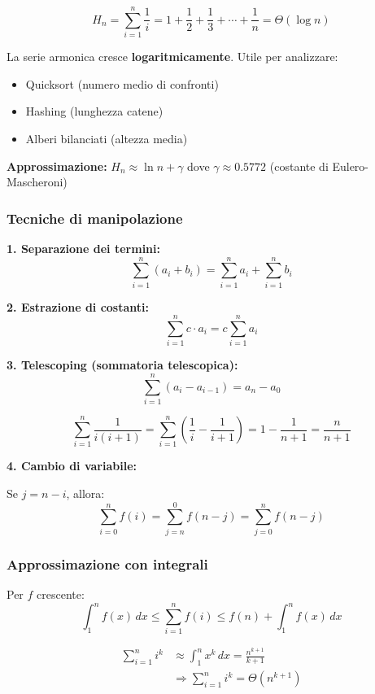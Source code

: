 \[
H_n = \sum_{i=1}^{n} \frac{1}{i} = 1 + \frac{1}{2} + \frac{1}{3} + \cdots + \frac{1}{n} = \Theta(\log n)
\]

\begin{nota}
	La serie armonica cresce \textbf{logaritmicamente}. Utile per analizzare:
	\begin{itemize}
		\item Quicksort (numero medio di confronti)
		\item Hashing (lunghezza catene)
		\item Alberi bilanciati (altezza media)
	\end{itemize}
	
	\textbf{Approssimazione:} $H_n \approx \ln n + \gamma$ dove $\gamma \approx 0.5772$ (costante di Eulero-Mascheroni)
\end{nota}

\subsubsection{Tecniche di manipolazione}

\textbf{1. Separazione dei termini:}
\[
\sum_{i=1}^{n} (a_i + b_i) = \sum_{i=1}^{n} a_i + \sum_{i=1}^{n} b_i
\]

\textbf{2. Estrazione di costanti:}
\[
\sum_{i=1}^{n} c \cdot a_i = c \sum_{i=1}^{n} a_i
\]

\textbf{3. Telescoping (sommatoria telescopica):}
\[
\sum_{i=1}^{n} (a_i - a_{i-1}) = a_n - a_0
\]

\begin{esempio}
	\[
	\sum_{i=1}^{n} \frac{1}{i(i+1)} = \sum_{i=1}^{n} \left(\frac{1}{i} - \frac{1}{i+1}\right) = 1 - \frac{1}{n+1} = \frac{n}{n+1}
	\]
\end{esempio}

\textbf{4. Cambio di variabile:}

Se $j = n - i$, allora:
\[
\sum_{i=0}^{n} f(i) = \sum_{j=n}^{0} f(n-j) = \sum_{j=0}^{n} f(n-j)
\]

\subsubsection{Approssimazione con integrali}

Per $f$ crescente:
\[
\int_{1}^{n} f(x)\,dx \leq \sum_{i=1}^{n} f(i) \leq f(n) + \int_{1}^{n} f(x)\,dx
\]

\begin{esempio}
	\begin{align*}
		\sum_{i=1}^{n} i^k &\approx \int_{1}^{n} x^k\,dx = \frac{n^{k+1}}{k+1} \\
		&\Rightarrow \sum_{i=1}^{n} i^k = \Theta(n^{k+1})
	\end{align*}
\end{esempio}


